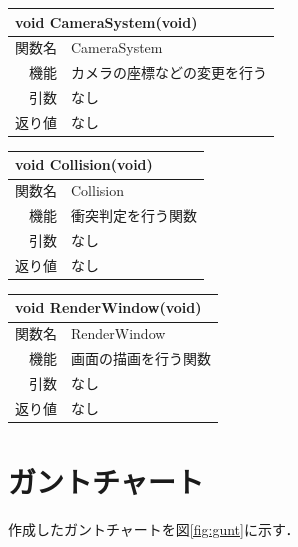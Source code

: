 \documentclass{jarticle}
\begin{document}
\begin{table}[H]
\begin{tabular}{|r|l|}
\hline
\multicolumn{2}{|l|}{void CameraSystem(void)}       \\ \hline
関数名           & CameraSystem  \\ \hline
機能     & カメラの座標などの変更を行う  \\
引数 	 	 & なし \\
返り値	 & なし \\ \hline
\end{tabular}
\end{table}

\begin{table}[H]
\begin{tabular}{|r|l|}
\hline
\multicolumn{2}{|l|}{void Collision(void)}       \\ \hline
関数名           & Collision  \\ \hline
機能     & 衝突判定を行う関数  \\
引数 	 	 & なし \\
返り値	 & なし \\ \hline
\end{tabular}
\end{table}

\begin{table}[H]
\begin{tabular}{|r|l|}
\hline
\multicolumn{2}{|l|}{void RenderWindow(void)}       \\ \hline
関数名           & RenderWindow  \\ \hline
機能     & 画面の描画を行う関数  \\
引数 	 	 & なし \\
返り値	 & なし \\ \hline
\end{tabular}
\end{table}


\section{ガントチャート}
作成したガントチャートを図\ref{fig:gunt}に示す．
\end{document}

